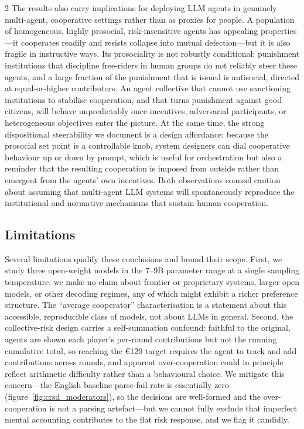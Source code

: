 \documentclass[openacc]{rsproca_new}%
\begin{document}
\begin{multicols}{2}
The results also carry implications for deploying LLM agents in genuinely multi-agent, cooperative settings rather than as proxies for people. A population of homogeneous, highly prosocial, risk-insensitive agents has appealing properties---it cooperates readily and resists collapse into mutual defection---but it is also fragile in instructive ways. Its prosociality is not robustly conditional: punishment institutions that discipline free-riders in human groups do not reliably steer these agents, and a large fraction of the punishment that is issued is antisocial, directed at equal-or-higher contributors. An agent collective that cannot use sanctioning institutions to stabilise cooperation, and that turns punishment against good citizens, will behave unpredictably once incentives, adversarial participants, or heterogeneous objectives enter the picture. At the same time, the strong dispositional steerability we document is a design affordance: because the prosocial set point is a controllable knob, system designers can dial cooperative behaviour up or down by prompt, which is useful for orchestration but also a reminder that the resulting cooperation is imposed from outside rather than emergent from the agents' own incentives. Both observations counsel caution about assuming that multi-agent LLM systems will spontaneously reproduce the institutional and normative mechanisms that sustain human cooperation.

\subsection{Limitations}

Several limitations qualify these conclusions and bound their scope. First, we study three open-weight models in the 7--9B parameter range at a single sampling temperature; we make no claim about frontier or proprietary systems, larger open models, or other decoding regimes, any of which might exhibit a richer preference structure. The ``average cooperator'' characterisation is a statement about this accessible, reproducible class of models, not about LLMs in general. Second, the collective-risk design carries a self-summation confound: faithful to the original, agents are shown each player's per-round contributions but not the running cumulative total, so reaching the €120 target requires the agent to track and add contributions across rounds, and apparent over-cooperation could in principle reflect arithmetic difficulty rather than a behavioural choice. We mitigate this concern---the English baseline parse-fail rate is essentially zero (figure~\ref{fig:crsd_moderators}), so the decisions are well-formed and the over-cooperation is not a parsing artefact---but we cannot fully exclude that imperfect mental accounting contributes to the flat risk response, and we flag it candidly.


\end{multicols}
\end{document}
